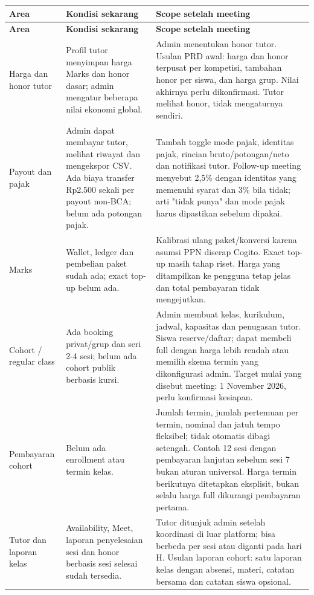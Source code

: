 \documentclass[10pt,a4paper]{article}
\begin{document}
{\small
\begin{longtable}{L{30.70mm}L{56.55mm}L{74.32mm}}
\hline
\textbf{Area} & \textbf{Kondisi sekarang} & \textbf{Scope setelah meeting} \\ \hline
\endfirsthead
\hline
\textbf{Area} & \textbf{Kondisi sekarang} & \textbf{Scope setelah meeting} \\ \hline
\endhead
Harga dan honor tutor & Profil tutor menyimpan harga Marks dan honor dasar; admin mengatur beberapa nilai ekonomi global. & Admin menentukan honor tutor. Usulan PRD awal: harga dan honor terpusat per kompetisi, tambahan honor per siswa, dan harga grup. Nilai akhirnya perlu dikonfirmasi. Tutor melihat honor, tidak mengaturnya sendiri. \\ \hline
Payout dan pajak & Admin dapat membayar tutor, melihat riwayat dan mengekspor CSV. Ada biaya transfer Rp2.500 sekali per payout non-BCA; belum ada potongan pajak. & Tambah toggle mode pajak, identitas pajak, rincian bruto/\allowbreak{}potongan/\allowbreak{}neto dan notifikasi tutor. Follow-up meeting menyebut 2,5\% dengan identitas yang memenuhi syarat dan 3\% bila tidak; arti "tidak punya" dan mode pajak harus dipastikan sebelum dipakai. \\ \hline
Marks & Wallet, ledger dan pembelian paket sudah ada; exact top-up belum ada. & Kalibrasi ulang paket/\allowbreak{}konversi karena asumsi PPN diserap Cogito. Exact top-up masih tahap riset. Harga yang ditampilkan ke pengguna tetap jelas dan total pembayaran tidak mengejutkan. \\ \hline
Cohort /\allowbreak{} regular class & Ada booking privat/\allowbreak{}grup dan seri 2-4 sesi; belum ada cohort publik berbasis kursi. & Admin membuat kelas, kurikulum, jadwal, kapasitas dan penugasan tutor. Siswa reserve/\allowbreak{}daftar; dapat membeli full dengan harga lebih rendah atau memilih skema termin yang dikonfigurasi admin. Target mulai yang disebut meeting: 1 November 2026, perlu konfirmasi kesiapan. \\ \hline
Pembayaran cohort & Belum ada enrollment atau termin kelas. & Jumlah termin, jumlah pertemuan per termin, nominal dan jatuh tempo fleksibel; tidak otomatis dibagi setengah. Contoh 12 sesi dengan pembayaran lanjutan sebelum sesi 7 bukan aturan universal. Harga termin berikutnya ditetapkan eksplisit, bukan selalu harga full dikurangi pembayaran pertama. \\ \hline
Tutor dan laporan kelas & Availability, Meet, laporan penyelesaian sesi dan honor berbasis sesi selesai sudah tersedia. & Tutor ditunjuk admin setelah koordinasi di luar platform; bisa berbeda per sesi atau diganti pada hari H. Usulan laporan cohort: satu laporan kelas dengan absensi, materi, catatan bersama dan catatan siswa opsional. \\ \hline

\end{longtable}}
\end{document}
